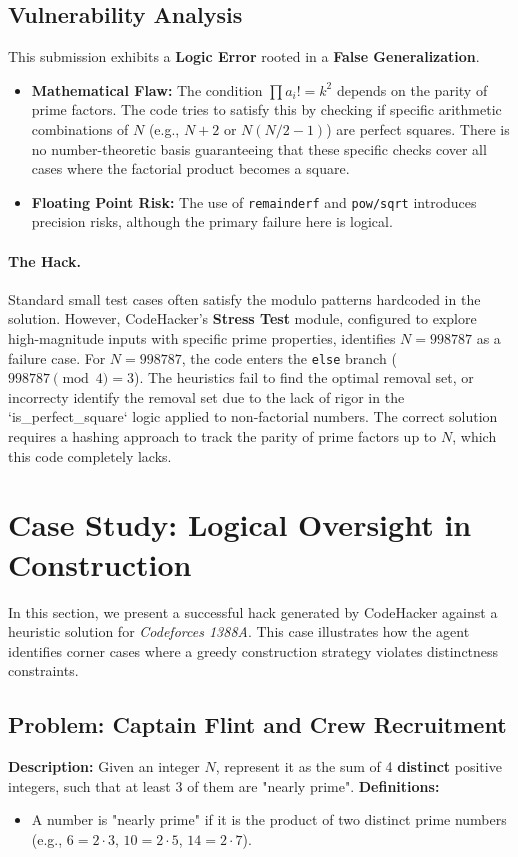 \documentclass[11pt]{article}
\begin{document}
\subsection{Vulnerability Analysis}
This submission exhibits a \textbf{Logic Error} rooted in a \textbf{False Generalization}.
\begin{itemize}
    \item \textbf{Mathematical Flaw:} The condition $\prod a_i! = k^2$ depends on the parity of prime factors. The code tries to satisfy this by checking if specific arithmetic combinations of $N$ (e.g., $N+2$ or $N(N/2-1)$) are perfect squares. There is no number-theoretic basis guaranteeing that these specific checks cover all cases where the factorial product becomes a square.
    \item \textbf{Floating Point Risk:} The use of \texttt{remainderf} and \texttt{pow/sqrt} introduces precision risks, although the primary failure here is logical.
\end{itemize}

\paragraph{The Hack.}
Standard small test cases often satisfy the modulo patterns hardcoded in the solution. However, CodeHacker's \textbf{Stress Test} module, configured to explore high-magnitude inputs with specific prime properties, identifies $N = 998787$ as a failure case.
For $N = 998787$, the code enters the \texttt{else} branch ($998787 \pmod 4 = 3$). The heuristics fail to find the optimal removal set, or incorrecty identify the removal set due to the lack of rigor in the `is\_perfect\_square` logic applied to non-factorial numbers. The correct solution requires a hashing approach to track the parity of prime factors up to $N$, which this code completely lacks.

\clearpage
\newpage
\section{Case Study: Logical Oversight in Construction}
\label{appx:logic_hack}

In this section, we present a successful hack generated by CodeHacker against a heuristic solution for \textit{Codeforces 1388A}. This case illustrates how the agent identifies corner cases where a greedy construction strategy violates distinctness constraints.

\subsection{Problem: Captain Flint and Crew Recruitment}
\textbf{Description:} Given an integer $N$, represent it as the sum of 4 \textbf{distinct} positive integers, such that at least 3 of them are "nearly prime".
\newline
\textbf{Definitions:}
\begin{itemize}
    \item A number is "nearly prime" if it is the product of two distinct prime numbers (e.g., $6=2\cdot3$, $10=2\cdot5$, $14=2\cdot7$).
\end{itemize}
\end{document}

